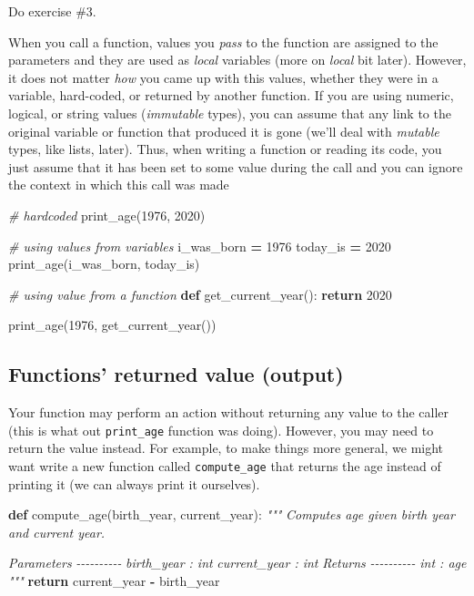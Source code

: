 \documentclass[
]{book}
\newenvironment{Shaded}{\begin{snugshade}}{\end{snugshade}}
\newcommand{\CommentTok}[1]{\textcolor[rgb]{0.56,0.35,0.01}{\textit{#1}}}
\newcommand{\ControlFlowTok}[1]{\textcolor[rgb]{0.13,0.29,0.53}{\textbf{#1}}}
\newcommand{\DecValTok}[1]{\textcolor[rgb]{0.00,0.00,0.81}{#1}}
\newcommand{\KeywordTok}[1]{\textcolor[rgb]{0.13,0.29,0.53}{\textbf{#1}}}
\newcommand{\NormalTok}[1]{#1}
\newcommand{\OperatorTok}[1]{\textcolor[rgb]{0.81,0.36,0.00}{\textbf{#1}}}
\begin{document}
Do exercise \#3.

When you call a function, values you \emph{pass} to the function are assigned to the parameters and they are used as \emph{local} variables (more on \emph{local} bit later). However, it does not matter \emph{how} you came up with this values, whether they were in a variable, hard-coded, or returned by another function. If you are using numeric, logical, or string values (\emph{immutable} types), you can assume that any link to the original variable or function that produced it is gone (we'll deal with \emph{mutable} types, like lists, later). Thus, when writing a function or reading its code, you just assume that it has been set to some value during the call and you can ignore the context in which this call was made

\begin{Shaded}
\begin{Highlighting}[]
\CommentTok{\# hardcoded}
\NormalTok{print\_age(}\DecValTok{1976}\NormalTok{, }\DecValTok{2020}\NormalTok{)}

\CommentTok{\# using values from variables}
\NormalTok{i\_was\_born }\OperatorTok{=} \DecValTok{1976}
\NormalTok{today\_is }\OperatorTok{=} \DecValTok{2020}
\NormalTok{print\_age(i\_was\_born, today\_is)}

\CommentTok{\# using value from a function}
\KeywordTok{def}\NormalTok{ get\_current\_year():}
    \ControlFlowTok{return} \DecValTok{2020}

\NormalTok{print\_age(}\DecValTok{1976}\NormalTok{, get\_current\_year())}
\end{Highlighting}
\end{Shaded}

\hypertarget{functions-returned-value-output}{%
\subsection{Functions' returned value (output)}\label{functions-returned-value-output}}

Your function may perform an action without returning any value to the caller (this is what out \texttt{print\_age} function was doing). However, you may need to return the value instead. For example, to make things more general, we might want write a new function called \texttt{compute\_age} that returns the age instead of printing it (we can always print it ourselves).

\begin{Shaded}
\begin{Highlighting}[]
\KeywordTok{def}\NormalTok{ compute\_age(birth\_year, current\_year):}
    \CommentTok{"""}
\CommentTok{    Computes age given birth year and current year.}

\CommentTok{    Parameters}
\CommentTok{    {-}{-}{-}{-}{-}{-}{-}{-}{-}{-}}
\CommentTok{    birth\_year : int}
\CommentTok{    current\_year : int}
\CommentTok{    }
\CommentTok{    Returns}
\CommentTok{    {-}{-}{-}{-}{-}{-}{-}{-}{-}{-}}
\CommentTok{    int : age}
\CommentTok{    """}
    \ControlFlowTok{return}\NormalTok{ current\_year }\OperatorTok{{-}}\NormalTok{ birth\_year}
\end{Highlighting}
\end{Shaded}
\end{document}
